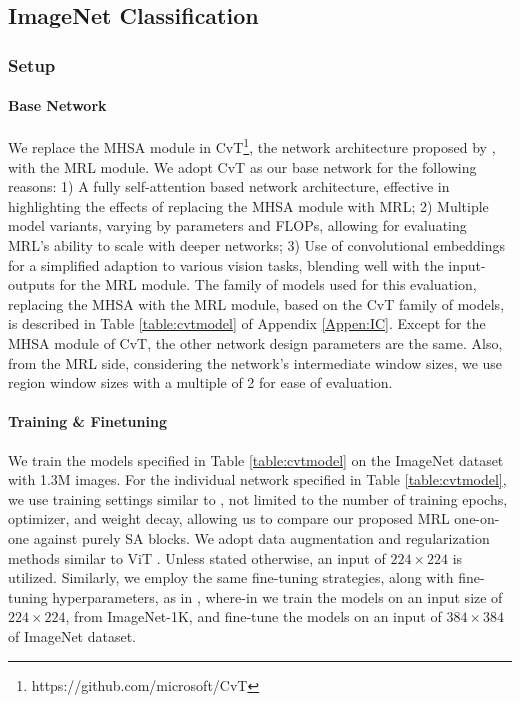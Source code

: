 \documentclass{article}
\begin{document}
\subsection{ImageNet Classification}\label{subsec:imagenet}

\subsubsection{Setup}
\paragraph{Base Network} We replace the MHSA module in CvT\footnote{https://github.com/microsoft/CvT}, the network architecture proposed by \cite{DBLP:journals/corr/CvT}, with the MRL module. We adopt CvT as our base network for the following reasons: 1) A fully self-attention based network architecture, effective in highlighting the effects of replacing the MHSA module with MRL; 2) Multiple model variants, varying by parameters and FLOPs, allowing for evaluating MRL's ability to scale with deeper networks; 3) Use of convolutional embeddings for a simplified adaption to various vision tasks, blending well with the input-outputs for the MRL module. The family of models used for this evaluation, replacing the MHSA with the MRL module, based on the CvT family of models, is described in Table \ref{table:cvtmodel} of Appendix \ref{Appen:IC}. Except for the MHSA module of CvT, the other network design parameters are the same. Also, from the MRL side, considering the network's intermediate window sizes, we use region window sizes with a multiple of 2 for ease of evaluation. 
\vspace{-4mm}
\paragraph{Training \& Finetuning} We train the models specified in Table \ref{table:cvtmodel} on the ImageNet dataset with 1.3M images. For the individual network specified in Table \ref{table:cvtmodel}, we use training settings similar to \cite{DBLP:journals/corr/CvT}, not limited to the number of training epochs, optimizer, and weight decay, allowing us to compare our proposed MRL one-on-one against purely SA blocks. We adopt data augmentation and regularization methods similar to ViT \cite{ViT}. Unless stated otherwise, an input of $224 \times 224$ is utilized. 
Similarly, we employ the same fine-tuning strategies, along with fine-tuning hyperparameters, as in \cite{DBLP:journals/corr/CvT}, where-in we train the models on an input size of $224 \times 224$, from ImageNet-1K, and fine-tune the models on an input of $384 \times 384$ of ImageNet dataset. 
\end{document}
